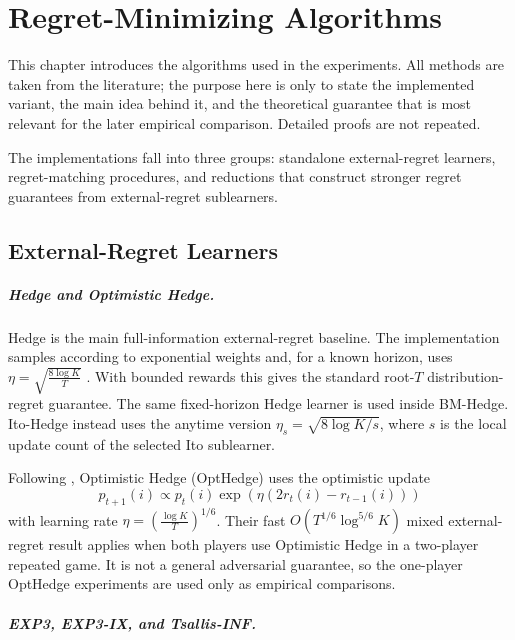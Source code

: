 
\chapter{Regret-Minimizing Algorithms}
\label{chap:algorithms}

This chapter introduces the algorithms used in the experiments. All methods are
taken from the literature; the purpose here is only to state the implemented
variant, the main idea behind it, and the theoretical guarantee that is most
relevant for the later empirical comparison. Detailed proofs are not repeated.

The implementations fall into three groups: standalone external-regret
learners, regret-matching procedures, and reductions that construct stronger
regret guarantees from external-regret sublearners.

\section{External-Regret Learners}

\paragraph{Hedge and Optimistic Hedge.}

Hedge is the main full-information external-regret baseline. The implementation samples according
to exponential weights and, for a known horizon, uses
\(\eta=\sqrt{\frac{8\log K}{T}}\) \citep{freund_decision-theoretic_1997}. With bounded rewards this gives the standard
root-$T$ distribution-regret guarantee. The same fixed-horizon Hedge learner is used inside BM-Hedge.
Ito-Hedge instead uses the anytime version
\(\eta_s=\sqrt{8\log K/s}\), where \(s\) is the local update count of the
selected Ito sublearner.

Following \citet{chen_hedging_2020}, Optimistic Hedge (OptHedge) uses the optimistic update
\[
    p_{t+1}(i)\propto
    p_t(i)\exp\!\left(\eta(2r_t(i)-r_{t-1}(i))\right)
\]
with learning rate \(\eta=\left(\frac{\log K}{T}\right)^{1/6}\). Their fast
\(O(T^{1/6}\log^{5/6}K)\) mixed external-regret result applies when both
players use Optimistic Hedge in a two-player repeated game. It is not a
general adversarial guarantee, so the one-player OptHedge experiments are used
only as empirical comparisons.

\paragraph{EXP3, EXP3-IX, and Tsallis-INF.}


